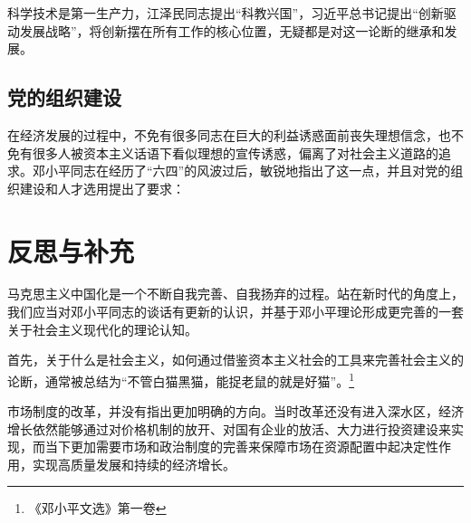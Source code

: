 \documentclass[12pt]{article}
\begin{document}
科学技术是第一生产力，江泽民同志提出“科教兴国”，习近平总书记提出“创新驱动发展战略”，将创新摆在所有工作的核心位置，无疑都是对这一论断的继承和发展。

\subsection{党的组织建设}
在经济发展的过程中，不免有很多同志在巨大的利益诱惑面前丧失理想信念，也不免有很多人被资本主义话语下看似理想的宣传诱惑，偏离了对社会主义道路的追求。邓小平同志在经历了“六四”的风波过后，敏锐地指出了这一点，并且对党的组织建设和人才选用提出了要求：



\section{反思与补充}
马克思主义中国化是一个不断自我完善、自我扬弃的过程。站在新时代的角度上，我们应当对邓小平同志的谈话有更新的认识，并基于邓小平理论形成更完善的一套关于社会主义现代化的理论认知。

首先，关于什么是社会主义，如何通过借鉴资本主义社会的工具来完善社会主义的论断，通常被总结为“不管白猫黑猫，能捉老鼠的就是好猫”。\footnote{《邓小平文选》第一卷}

市场制度的改革，并没有指出更加明确的方向。当时改革还没有进入深水区，经济增长依然能够通过对价格机制的放开、对国有企业的放活、大力进行投资建设来实现，而当下更加需要市场和政治制度的完善来保障市场在资源配置中起决定性作用，实现高质量发展和持续的经济增长。
\end{document}
